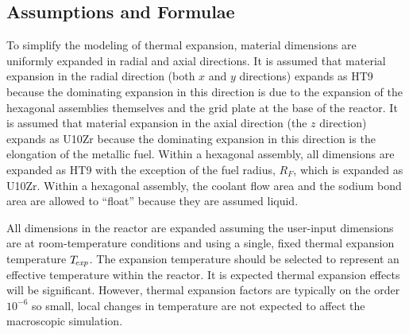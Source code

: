   \subsection{Assumptions and Formulae}
  \label{sec:model_details__assumptions_and_formulae}
    To simplify the modeling of thermal expansion, material dimensions are
    uniformly expanded in radial and axial directions. It is assumed that 
    material expansion in the radial direction (both $x$ and $y$ directions) 
    expands as HT9 because the dominating expansion in this direction is due to 
    the expansion of the hexagonal assemblies themselves and the grid plate at
    the base of the reactor. It is assumed that
    material expansion in the axial direction (the $z$ direction) expands as 
    U10Zr because the dominating expansion in this direction is the elongation 
    of the metallic fuel. Within a hexagonal assembly, all dimensions are 
    expanded as HT9 with the exception of the fuel radius, $R_F$, which is 
    expanded as U10Zr. Within a hexagonal assembly, the coolant flow area and 
    the sodium bond area are allowed to ``float'' because they are assumed 
    liquid.
    
    All dimensions in the reactor are expanded assuming the user-input 
    dimensions are at room-temperature conditions and using a single, fixed 
    thermal expansion temperature $T_{\!\mbox{\scriptsize \em exp}}$. The expansion temperature should be 
    selected to represent an effective temperature within the reactor. It is 
    expected thermal expansion effects will be significant. However, thermal 
    expansion factors are typically on the order $10^{-6}$ so small, local 
    changes in temperature are not expected to affect the macroscopic 
    simulation.

